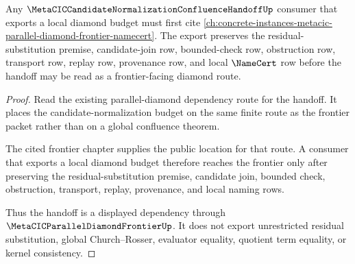 \begin{theorem}
\label{thm:metacic-candidate-normalization-confluence-handoff-parallel-diamond-frontier-route}
Any $\MetaCICCandidateNormalizationConfluenceHandoffUp$ consumer that exports a local diamond budget must first cite \autoref{ch:concrete-instances-metacic-parallel-diamond-frontier-namecert}. The export preserves the residual-substitution premise, candidate-join row, bounded-check row, obstruction row, transport row, replay row, provenance row, and local $\NameCert$ row before the handoff may be read as a frontier-facing diamond route.
\end{theorem}
\begin{proof}
Read the existing parallel-diamond dependency route for the handoff. It places the candidate-normalization budget on the same finite route as the frontier packet rather than on a global confluence theorem.

The cited frontier chapter supplies the public location for that route. A consumer that exports a local diamond budget therefore reaches the frontier only after preserving the residual-substitution premise, candidate join, bounded check, obstruction, transport, replay, provenance, and local naming rows.

Thus the handoff is a displayed dependency through $\MetaCICParallelDiamondFrontierUp$. It does not export unrestricted residual substitution, global Church--Rosser, evaluator equality, quotient term equality, or kernel consistency.
\end{proof}
